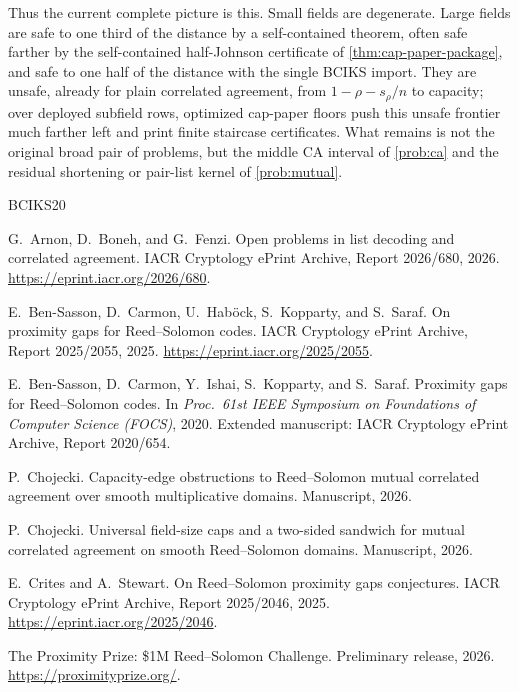 \documentclass[11pt]{amsart}
\theoremstyle{definition}
\theoremstyle{remark}
\begin{document}
Thus the current complete picture is this.  Small fields are degenerate.  Large
fields are safe to one third of the distance by a self-contained theorem, often
safe farther by the self-contained half-Johnson certificate of
\cref{thm:cap-paper-package}, and safe to one half of the distance with the
single BCIKS import.  They are unsafe, already for plain correlated agreement,
from $1-\rho-s_\rho/n$ to capacity; over deployed subfield rows, optimized cap-paper
floors push this unsafe frontier much farther left and print finite staircase
certificates.  What remains is not the original broad pair of problems, but the
middle CA interval of \cref{prob:ca} and the residual shortening or pair-list
kernel of \cref{prob:mutual}.

\medskip
\begin{thebibliography}{BCIKS20}

G.~Arnon, D.~Boneh, and G.~Fenzi.
\newblock Open problems in list decoding and correlated agreement.
\newblock IACR Cryptology ePrint Archive, Report 2026/680, 2026.
\newblock \url{https://eprint.iacr.org/2026/680}.

E.~Ben-Sasson, D.~Carmon, U.~Hab{\"o}ck, S.~Kopparty, and S.~Saraf.
\newblock On proximity gaps for Reed--Solomon codes.
\newblock IACR Cryptology ePrint Archive, Report 2025/2055, 2025.
\newblock \url{https://eprint.iacr.org/2025/2055}.

E.~Ben-Sasson, D.~Carmon, Y.~Ishai, S.~Kopparty, and S.~Saraf.
\newblock Proximity gaps for Reed--Solomon codes.
\newblock In \emph{Proc.\ 61st IEEE Symposium on Foundations of Computer Science (FOCS)}, 2020.
\newblock Extended manuscript: IACR Cryptology ePrint Archive, Report 2020/654.

P.~Chojecki.
\newblock Capacity-edge obstructions to Reed--Solomon mutual correlated agreement over smooth multiplicative domains.
\newblock Manuscript, 2026.

P.~Chojecki.
\newblock Universal field-size caps and a two-sided sandwich for mutual correlated agreement on smooth Reed--Solomon domains.
\newblock Manuscript, 2026.

E.~Crites and A.~Stewart.
\newblock On Reed--Solomon proximity gaps conjectures.
\newblock IACR Cryptology ePrint Archive, Report 2025/2046, 2025.
\newblock \url{https://eprint.iacr.org/2025/2046}.

The Proximity Prize: \$1M Reed--Solomon Challenge.
\newblock Preliminary release, 2026.
\newblock \url{https://proximityprize.org/}.

\end{thebibliography}
\end{document}
